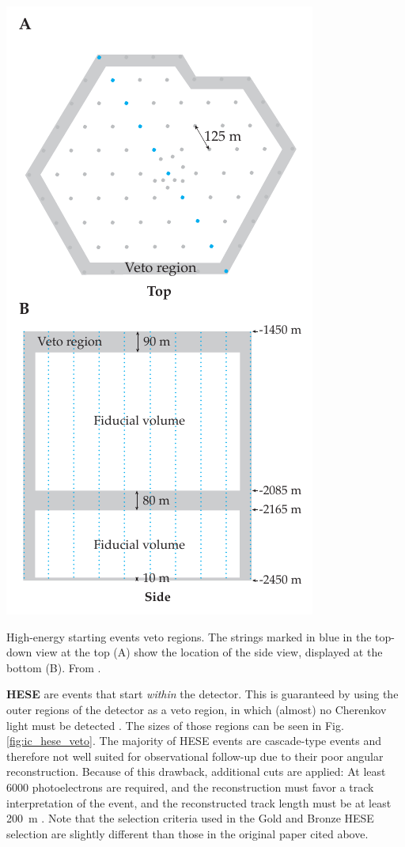 \documentclass[
    a4paper, %
    fontsize=10pt, %
    twoside=false, %
    numbers=noenddot, %
    fontmethod=tex,
]{kaobook}
\begin{document}
\begin{marginfigure}
    \includegraphics{ic/ic_HESE_veto.pdf}
    \caption[HESE veto regions]{High-energy starting events veto regions. The strings marked in blue in the top-down view at the top (A) show the location of the side view, displayed at the bottom (B). From \cite{Aartsen2013}.}
\end{marginfigure}

\textbf{HESE} are events that start \textit{within} the detector. This is guaranteed by using the outer regions of the detector as a veto region, in which (almost) no Cherenkov light must be detected . The sizes of those regions can be seen in Fig. \ref{fig:ic_hese_veto}. The majority of HESE events are cascade-type events and therefore not well suited for observational follow-up due to their poor angular reconstruction. Because of this drawback, additional cuts are applied: At least 6000 photoelectrons are required, and the reconstruction must favor a track interpretation of the event, and the reconstructed track length must be at least \SI{200}{\meter} \cite{Abbasi2023}. Note that the selection criteria used in the Gold and Bronze HESE selection are slightly different than those in the original paper cited above.
\end{document}
